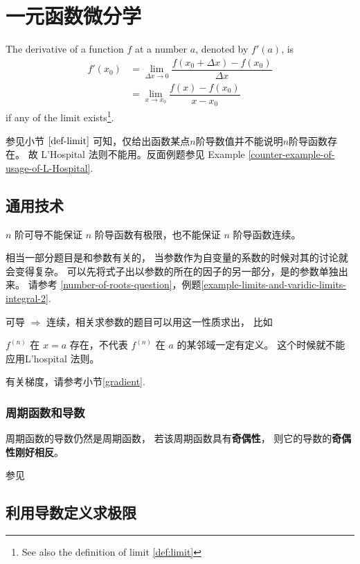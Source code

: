 \twocolumn
\chapter{一元函数微分学}

\begin{definition}
    \label{def:single-order-derivative}
    The derivative of a function $f$ at a number $a$, denoted by $f'(a)$, is 
    \begin{align}
        f'(x_0) &= \lim_{\Delta x \to 0} \dfrac{f(x_0+\Delta x) - f(x_0)}{\Delta x} \\
                &= \lim_{x \to x_0} \dfrac{f(x) - f(x_0)}{x - x_0}
    \end{align}
    if any of the limit exists\footnote{See also the definition of limit \ref{def:limit}}.
\end{definition}
参见小节 $\ref{def-limit}$ 可知，仅给出函数某点$n$阶导数值并不能说明$n$阶导函数存在。
故 L'Hospital 法则不能用。反面例题参见 Example \ref{counter-example-of-usage-of-L-Hospital}.

\section{通用技术}
\label{general-technics-single-var-differentiation}

$n$ 阶可导不能保证 $n$ 阶导函数有极限，也不能保证 $n$ 阶导函数连续。

相当一部分题目是和参数有关的，
当参数作为自变量的系数的时候对其的讨论就会变得复杂。
可以先将式子出以参数的所在的因子的另一部分，是的参数单独出来。
请参考 \ref{number-of-roots-question}，例题\ref{example-limits-and-varidic-limits-integral-2}.

可导 $\Rightarrow$ 连续，相关求参数的题目可以用这一性质求出，
比如 \cite[quest27]{w660}

$f^{(n)}$ 在 $x = a$ 存在，不代表 $f^{(n)}$ 在 $a$ 的某邻域一定有定义。
这个时候就不能应用L'hospital 法则。

有关梯度，请参考小节\ref{gradient}.

\subsection{周期函数和导数}

周期函数的导数仍然是周期函数，
若该周期函数具有\textbf{奇偶性}，
则它的导数的\textbf{奇偶性刚好相反}。

参见 \cite[quest29]{w660}

\section{利用导数定义求极限}

